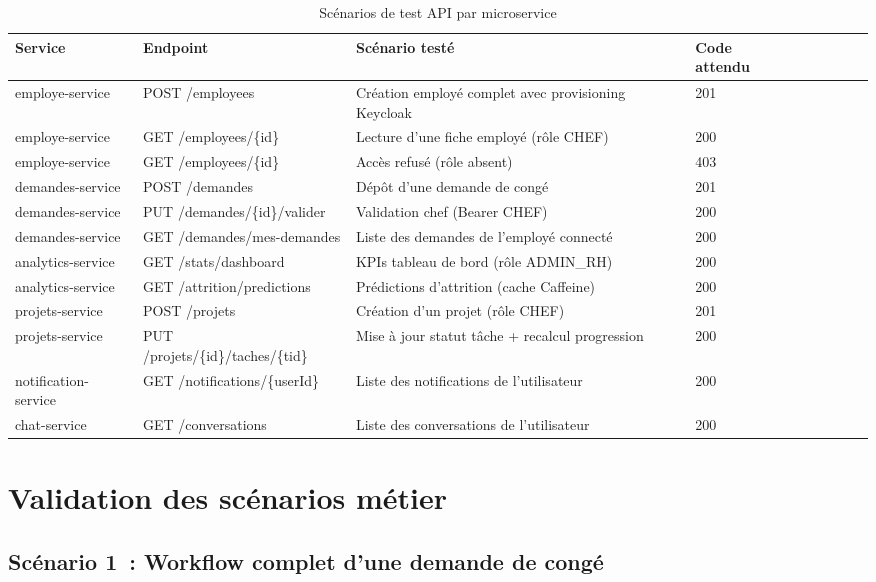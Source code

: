 \begin{table}[H]
\centering
\caption{Scénarios de test API par microservice}
\label{tab:api_tests}
\begin{tabularx}{\textwidth}{VlVlVLVlV}
\hline
\textbf{Service} & \textbf{Endpoint} & \textbf{Scénario testé} & \textbf{Code attendu} \\
\hline
employe-service & POST /employees & Création employé complet avec provisioning Keycloak & 201 \\
\hline
employe-service & GET /employees/\{id\} & Lecture d'une fiche employé (rôle CHEF) & 200 \\
\hline
employe-service & GET /employees/\{id\} & Accès refusé (rôle absent) & 403 \\
\hline
demandes-service & POST /demandes & Dépôt d'une demande de congé & 201 \\
\hline
demandes-service & PUT /demandes/\{id\}/valider & Validation chef (Bearer CHEF) & 200 \\
\hline
demandes-service & GET /demandes/mes-demandes & Liste des demandes de l'employé connecté & 200 \\
\hline
analytics-service & GET /stats/dashboard & KPIs tableau de bord (rôle ADMIN\_RH) & 200 \\
\hline
analytics-service & GET /attrition/predictions & Prédictions d'attrition (cache Caffeine) & 200 \\
\hline
projets-service & POST /projets & Création d'un projet (rôle CHEF) & 201 \\
\hline
projets-service & PUT /projets/\{id\}/taches/\{tid\} & Mise à jour statut tâche + recalcul progression & 200 \\
\hline
notification-service & GET /notifications/\{userId\} & Liste des notifications de l'utilisateur & 200 \\
\hline
chat-service & GET /conversations & Liste des conversations de l'utilisateur & 200 \\
\hline
\end{tabularx}
\end{table}

\section{Validation des scénarios métier}

\subsection{Scénario 1~: Workflow complet d'une demande de congé}

